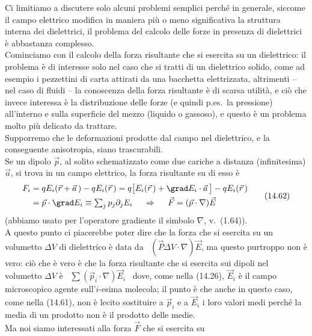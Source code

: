 Ci limitiamo a discutere solo alcuni problemi semplici perch\'e in generale,
siccome il campo elettrico modifica in maniera pi\`u o meno significativa la
struttura interna dei dielettrici, il problema del calcolo delle forze in
presenza di dielettrici \`e abbastanza complesso.\\
Cominciamo con il calcolo della forza risultante che si esercita su un
dielettrico: il problema \`e di interesse solo nel caso che si tratti di un
dielettrico solido, come ad esempio i pezzettini di carta attirati da una
bacchetta elettrizzata, altrimenti -- nel caso di fluidi -- la conoscenza della
forza risultante \`e di scarsa utilit\`a, e ci\`o che invece interessa \`e la
distribuzione delle forze (e quindi p.es.\ la pressione) all'interno e sulla
superficie del mezzo (liquido o gassoso), e questo \`e un problema molto pi\`u
delicato da trattare.\\
Supporremo che le deformazioni prodotte dal campo nel dielettrico, e la
conseguente anisotropia, siano trascurabili.\\
Se un dipolo $\vec p$, al solito schematizzato come due cariche a distanza
(infinitesima) $\vec a$, si trova in un campo elettrico, la forza risultante su
di esso \`e
\begin{equation}
  \begin{aligned}
    F_i&=qE_i(\vec r+\vec a\,)-qE_i(\vec r\,)
    =q\big[E_i(\vec r\,)+\grad E_i\cdot\vec a\,\big]-qE_i(\vec r\,)\\
    &=\vec p\cdot\grad E_i\equiv\textstyle\sum_jp_j\partial_jE_i
    \quad\ \Rightarrow\quad\ \vec F=(\vec p\cdot\nabla)\vec E
  \end{aligned}
  \tag{14.62}
\end{equation}
\big(abbiamo usato per l'operatore gradiente il simbolo $\nabla$,
v.\ (1.64)\big).\\
A questo punto ci piacerebbe poter dire che la forza che si esercita su un
volumetto $\Delta V$ di dielettrico \`e data da
\ $(\vec P\Delta V\cdot\nabla)\vec E$, ma questo purtroppo non \`e vero: ci\`o
che \`e
vero \`e che la forza risultante che si esercita sui dipoli nel volumetto
$\Delta V$ \`e \ $\sum(\vec p_i\cdot\nabla)\vec E_i$ \ dove, come nella (14.26),
$\vec E_i$ \`e il campo microscopico agente sull'$i$-esima molecola; il punto
\`e che anche in questo caso, come nella (14.61), non \`e lecito sostituire a
$\vec p_i$ e a $\vec E_i$ i loro valori medi perch\'e la media di un prodotto
non \`e il prodotto delle medie.\\
Ma noi siamo interessati alla forza $\vec F$ che si esercita su
